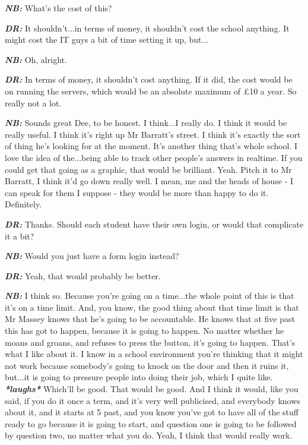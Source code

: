 \textit{\textbf{NB:}} What's the cost of this?

\textit{\textbf{DR:}} It shouldn't...in terms of money, it shouldn't cost the school anything. It might cost the IT guys a bit of time setting it up, but...

\textit{\textbf{NB:}} Oh, alright.

\textit{\textbf{DR:}} In terms of money, it shouldn't cost anything. If it did, the cost would be on running the servers, which would be an absolute maximum of \pounds10 a year. So really not a lot.

\textit{\textbf{NB:}} Sounds great Dee, to be honest. I think...I really do. I think it would be really useful. I think it's right up Mr Barratt's street. I think it's exactly the sort of thing he's looking for at the moment. It's another thing that's whole school. I love the idea of the...being able to track other people's answers in realtime. If you could get that going as a graphic, that would be brilliant. Yeah. Pitch it to Mr Barratt, I think it'd go down really well. I mean, me and the heads of house - I can speak for them I suppose - they would be more than happy to do it. Definitely.

\textit{\textbf{DR:}} Thanks. Should each student have their own login, or would that complicate it a bit?

\textit{\textbf{NB:}} Would you just have a form login instead?

\textit{\textbf{DR:}} Yeah, that would probably be better.

\textit{\textbf{NB:}} I think so. Because you're going on a time...the whole point of this is that it's on a time limit. And, you know, the good thing about that time limit is that Mr Massey knows that he's going to be accountable. He knows that at five past this has got to happen, because it is going to happen. No matter whether he moans and groans, and refuses to press the button, it's going to happen. That's what I like about it. I know in a school environment you're thinking that it might not work because somebody's going to knock on the door and then it ruins it, but...it is going to pressure people into doing their job, which I quite like. \textit{\textbf{*laughs*}} Which'll be good. That would be good. And I think it would, like you said, if you do it once a term, and it's very well publicised, and everybody knows about it, and it starts at 5 past, and you know you've got to have all of the stuff ready to go because it is going to start, and question one is going to be followed by question two, no matter what you do. Yeah, I think that would really work.

